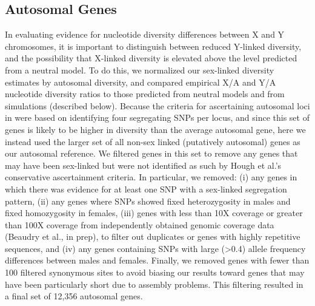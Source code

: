 \documentclass[9pt,twocolumn,twoside,lineno]{gsajnl}
\begin{document}
\subsection*{Autosomal Genes}
In evaluating evidence for nucleotide diversity differences between X and Y chromosomes, it is important to distinguish between reduced Y-linked diversity, and the possibility that X-linked diversity is elevated above the level predicted from a neutral model. To do this, we normalized our sex-linked diversity estimates by autosomal diversity, and compared empirical X/A and Y/A nucleotide diversity ratios to those predicted from neutral models and from simulations (described below). Because the criteria for ascertaining autosomal loci in \citet{hough2014} were based on identifying four segregating SNPs per locus, and since this set of genes is likely to be higher in diversity than the average autosomal gene, here we instead used the larger set of all non-sex linked (putatively autosomal) genes as our autosomal reference. We filtered genes in this set to remove any genes that may have been sex-linked but were not identified as such by Hough et al.'s conservative ascertainment criteria. In particular, we removed: (i) any genes in which there was evidence for at least one SNP with a sex-linked segregation pattern, (ii) any genes where SNPs showed fixed heterozygosity in males and fixed homozygosity in females, (iii) genes with less than 10X coverage or greater than 100X coverage from independently obtained genomic coverage data (Beaudry et al., in prep), to filter out duplicates or genes with highly repetitive sequences, and (iv) any genes containing SNPs with large (>0.4) allele frequency differences between males and females. Finally, we removed genes with fewer than 100 filtered synonymous sites to avoid biasing our results toward genes that may have been particularly short due to assembly problems. This filtering resulted in a final set of 12,356 autosomal genes.
\end{document}
